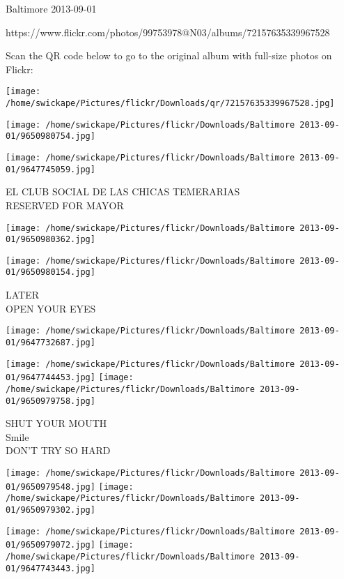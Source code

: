 \documentclass[10pt,letterpaper]{article}
\begin{document}
Baltimore 2013-09-01

https://www.flickr.com/photos/99753978@N03/albums/72157635339967528

Scan the QR code below to go to the original album with full-size photos on Flickr:

\texttt{[image: /home/swickape/Pictures/flickr/Downloads/qr/72157635339967528.jpg]}
\pagebreak

\texttt{[image: /home/swickape/Pictures/flickr/Downloads/Baltimore 2013-09-01/9650980754.jpg]}

\vspace{0.25in}
\texttt{[image: /home/swickape/Pictures/flickr/Downloads/Baltimore 2013-09-01/9647745059.jpg]}

EL CLUB SOCIAL DE LAS CHICAS TEMERARIAS\\
RESERVED FOR MAYOR
\pagebreak

\texttt{[image: /home/swickape/Pictures/flickr/Downloads/Baltimore 2013-09-01/9650980362.jpg]}

\vspace{0.25in}
\texttt{[image: /home/swickape/Pictures/flickr/Downloads/Baltimore 2013-09-01/9650980154.jpg]}

LATER\\
OPEN YOUR EYES
\pagebreak

\texttt{[image: /home/swickape/Pictures/flickr/Downloads/Baltimore 2013-09-01/9647732687.jpg]}

\vspace{0.25in}
\texttt{[image: /home/swickape/Pictures/flickr/Downloads/Baltimore 2013-09-01/9647744453.jpg]}
\texttt{[image: /home/swickape/Pictures/flickr/Downloads/Baltimore 2013-09-01/9650979758.jpg]}

SHUT YOUR MOUTH\\
Smile\\
DON'T TRY SO HARD
\pagebreak

\texttt{[image: /home/swickape/Pictures/flickr/Downloads/Baltimore 2013-09-01/9650979548.jpg]}
\texttt{[image: /home/swickape/Pictures/flickr/Downloads/Baltimore 2013-09-01/9650979302.jpg]}

\texttt{[image: /home/swickape/Pictures/flickr/Downloads/Baltimore 2013-09-01/9650979072.jpg]}
\texttt{[image: /home/swickape/Pictures/flickr/Downloads/Baltimore 2013-09-01/9647743443.jpg]}
\end{document}
